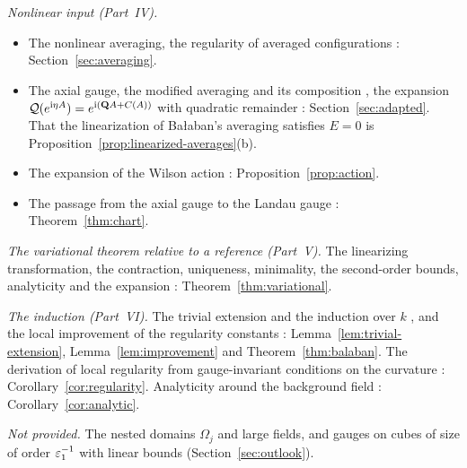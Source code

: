 \emph{Nonlinear input (Part~IV).}
\begin{itemize}
\item The nonlinear averaging, the regularity of averaged configurations \cite[Props.~1, 2]{BalAvg}: Section~\ref{sec:averaging}.
\item The axial gauge, the modified averaging and its composition \cite[Sect.~C]{BalAvg}, the expansion $\mathcal Q(e^{\mathrm i\eta A})=e^{\mathrm i(\mathbf Q A+C(A))}$ with quadratic remainder \cite[Props.~3--5]{BalAvg}: Section~\ref{sec:adapted}. That the linearization of Ba\l aban's averaging satisfies $E=0$ \cite[(3.114)--(3.115)]{BalBackground} is Proposition~\ref{prop:linearized-averages}(b).
\item The expansion of the Wilson action \cite[(25)--(40)]{BalVar}: Proposition~\ref{prop:action}.
\item The passage from the axial gauge to the Landau gauge \cite[Theorem~2]{BalReg}: Theorem~\ref{thm:chart}.
\end{itemize}

\emph{The variational theorem relative to a reference (Part~V).} The linearizing transformation, the contraction, uniqueness, minimality, the second-order bounds, analyticity and the expansion \cite[Sects.~C--E, G]{BalVar}: Theorem~\ref{thm:variational}.

\emph{The induction (Part~VI).} The trivial extension and the induction over $k$ \cite[Sect.~A, (11)--(14)]{BalVar}, and the local improvement of the regularity constants \cite[Sect.~F]{BalVar}: Lemma~\ref{lem:trivial-extension}, Lemma~\ref{lem:improvement} and Theorem~\ref{thm:balaban}. The derivation of local regularity from gauge-invariant conditions on the curvature \cite[Sect.~F, Prop.~6]{BalReg}: Corollary~\ref{cor:regularity}. Analyticity around the background field \cite[Sect.~G]{BalVar}: Corollary~\ref{cor:analytic}.

\emph{Not provided.} The nested domains $\Omega_j$ and large fields, and gauges on cubes of size of order $\varepsilon_1^{-1}$ with linear bounds (Section~\ref{sec:outlook}).
